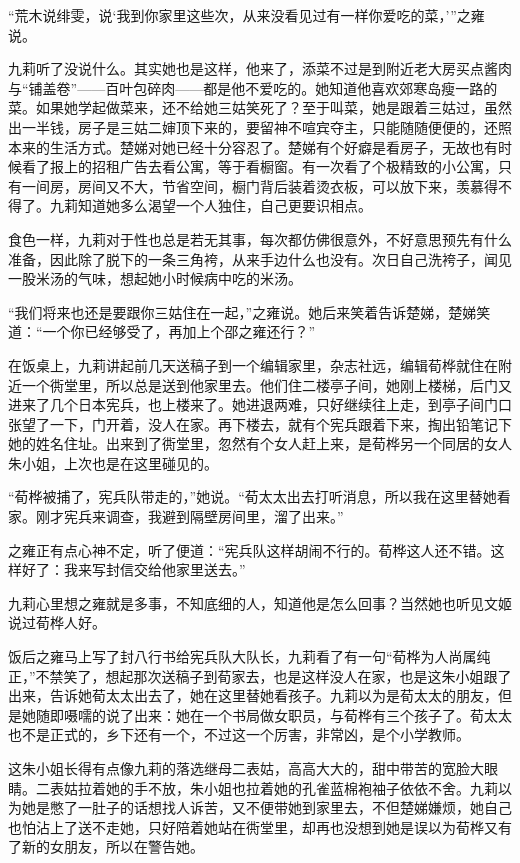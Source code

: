 \par “荒木说绯雯，说‘我到你家里这些次，从来没看见过有一样你爱吃的菜，'”之雍说。
\par 九莉听了没说什么。其实她也是这样，他来了，添菜不过是到附近老大房买点酱肉与“铺盖卷”——百叶包碎肉——都是他不爱吃的。她知道他喜欢郊寒岛瘦一路的菜。如果她学起做菜来，还不给她三姑笑死了？至于叫菜，她是跟着三姑过，虽然出一半钱，房子是三姑二婶顶下来的，要留神不喧宾夺主，只能随随便便的，还照本来的生活方式。楚娣对她已经十分容忍了。楚娣有个好癖是看房子，无故也有时候看了报上的招租广告去看公寓，等于看橱窗。有一次看了个极精致的小公寓，只有一间房，房间又不大，节省空间，橱门背后装着烫衣板，可以放下来，羡慕得不得了。九莉知道她多么渴望一个人独住，自己更要识相点。
\par 食色一样，九莉对于性也总是若无其事，每次都仿佛很意外，不好意思预先有什么准备，因此除了脱下的一条三角袴，从来手边什么也没有。次日自己洗袴子，闻见一股米汤的气味，想起她小时候病中吃的米汤。
\par “我们将来也还是要跟你三姑住在一起，”之雍说。她后来笑着告诉楚娣，楚娣笑道：“一个你已经够受了，再加上个邵之雍还行？”
\par 在饭桌上，九莉讲起前几天送稿子到一个编辑家里，杂志社远，编辑荀桦就住在附近一个衖堂里，所以总是送到他家里去。他们住二楼亭子间，她刚上楼梯，后门又进来了几个日本宪兵，也上楼来了。她进退两难，只好继续往上走，到亭子间门口张望了一下，门开着，没人在家。再下楼去，就有个宪兵跟着下来，掏出铅笔记下她的姓名住址。出来到了衖堂里，忽然有个女人赶上来，是荀桦另一个同居的女人朱小姐，上次也是在这里碰见的。
\par “荀桦被捕了，宪兵队带走的，”她说。“荀太太出去打听消息，所以我在这里替她看家。刚才宪兵来调查，我避到隔壁房间里，溜了出来。”
\par 之雍正有点心神不定，听了便道：“宪兵队这样胡闹不行的。荀桦这人还不错。这样好了：我来写封信交给他家里送去。”
\par 九莉心里想之雍就是多事，不知底细的人，知道他是怎么回事？当然她也听见文姬说过荀桦人好。
\par 饭后之雍马上写了封八行书给宪兵队大队长，九莉看了有一句“荀桦为人尚属纯正，”不禁笑了，想起那次送稿子到荀家去，也是这样没人在家，也是这朱小姐跟了出来，告诉她荀太太出去了，她在这里替她看孩子。九莉以为是荀太太的朋友，但是她随即嗫嚅的说了出来：她在一个书局做女职员，与荀桦有三个孩子了。荀太太也不是正式的，乡下还有一个，不过这一个厉害，非常凶，是个小学教师。
\par 这朱小姐长得有点像九莉的落选继母二表姑，高高大大的，甜中带苦的宽脸大眼睛。二表姑拉着她的手不放，朱小姐也拉着她的孔雀蓝棉袍袖子依依不舍。九莉以为她是憋了一肚子的话想找人诉苦，又不便带她到家里去，不但楚娣嫌烦，她自己也怕沾上了送不走她，只好陪着她站在衖堂里，却再也没想到她是误以为荀桦又有了新的女朋友，所以在警告她。
